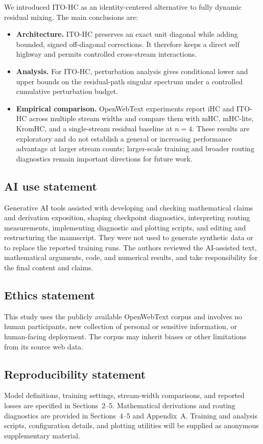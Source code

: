 \documentclass{article}
\begin{document}
We introduced ITO-HC as an identity-centered alternative to fully dynamic
residual mixing. The main conclusions are:
\begin{itemize}
\item \textbf{Architecture.} ITO-HC preserves an exact unit diagonal while
adding bounded, signed off-diagonal corrections. It therefore keeps a direct
self highway and permits controlled cross-stream interactions.
\item \textbf{Analysis.} For ITO-HC, perturbation analysis
gives conditional lower and upper bounds on the residual-path singular
spectrum under a controlled cumulative perturbation budget.
\item \textbf{Empirical comparison.} OpenWebText experiments report iHC and
ITO-HC across multiple stream widths and compare them with mHC, mHC-lite,
KromHC, and a single-stream residual baseline at $n=4$.
These results are exploratory and do not establish a general or increasing
performance advantage at larger stream counts; larger-scale training and
broader routing diagnostics remain important directions for future work.
\end{itemize}

\subsection*{AI use statement}
Generative AI tools assisted with developing and checking mathematical claims
and derivation exposition, shaping checkpoint diagnostics, interpreting
routing measurements, implementing diagnostic and plotting scripts, and
editing and restructuring the manuscript. They were not used to generate
synthetic data or to replace the reported training runs. The authors reviewed
the AI-assisted text, mathematical arguments, code, and numerical results, and
take responsibility for the final content and claims.

\subsection*{Ethics statement}
This study uses the publicly available OpenWebText corpus and involves no human
participants, new collection of personal or sensitive information, or
human-facing deployment. The corpus may inherit biases or other limitations
from its source web data.

\subsection*{Reproducibility statement}
Model definitions, training settings, stream-width comparisons, and reported
losses are specified in Sections~2--5. Mathematical derivations and routing
diagnostics are provided in Sections~4--5 and Appendix~A. Training and analysis scripts,
configuration details, and plotting utilities will be supplied as anonymous
supplementary material.
\end{document}
